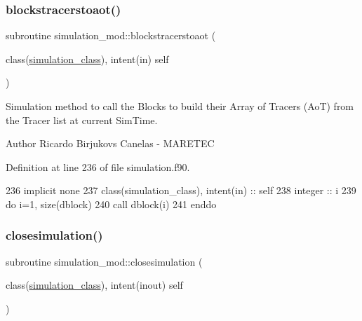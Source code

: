 \subsubsection{\texorpdfstring{blockstracerstoaot()}{blockstracerstoaot()}}
{\footnotesize\ttfamily subroutine simulation\+\_\+mod\+::blockstracerstoaot (\begin{DoxyParamCaption}\item[{class(\mbox{\hyperlink{structsimulation__mod_1_1simulation__class}{simulation\+\_\+class}}), intent(in)}]{self }\end{DoxyParamCaption})\hspace{0.3cm}{\ttfamily [private]}}



Simulation method to call the Blocks to build their Array of Tracers (AoT) from the Tracer list at current Sim\+Time. 

\begin{DoxyAuthor}{Author}
Ricardo Birjukovs Canelas -\/ M\+A\+R\+E\+T\+EC 
\end{DoxyAuthor}


Definition at line 236 of file simulation.\+f90.


\begin{DoxyCode}
236     \textcolor{keywordtype}{implicit none}
237     \textcolor{keywordtype}{class}(simulation\_class), \textcolor{keywordtype}{intent(in)} :: self
238     \textcolor{keywordtype}{integer} :: i
239     \textcolor{keywordflow}{do} i=1, \textcolor{keyword}{size}(dblock)
240         \textcolor{keyword}{call }dblock(i)%
241 \textcolor{keywordflow}{    enddo}
\end{DoxyCode}
\mbox{\label{namespacesimulation__mod_a4285722eaa589fa671233554b54c74f8}} 
\subsubsection{\texorpdfstring{closesimulation()}{closesimulation()}}
{\footnotesize\ttfamily subroutine simulation\+\_\+mod\+::closesimulation (\begin{DoxyParamCaption}\item[{class(\mbox{\hyperlink{structsimulation__mod_1_1simulation__class}{simulation\+\_\+class}}), intent(inout)}]{self }\end{DoxyParamCaption})\hspace{0.3cm}{\ttfamily [private]}}



